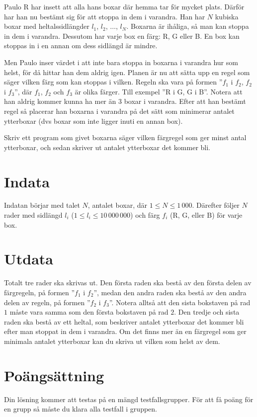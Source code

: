Paulo R har insett att alla hans boxar där hemma tar för mycket plats. Därför har han nu
bestämt sig för att stoppa in dem i varandra. Han har $N$ kubiska boxar med
heltalssidlängder $l_1$, $l_2$, $\ldots$, $l_N$. Boxarna är ihåliga, så man kan stoppa in
dem i varandra. Dessutom har varje box en färg: R, G eller B. 
En box kan stoppas in i en annan om dess sidlängd är mindre.

Men Paulo inser värdet i att inte bara stoppa in boxarna i varandra hur som helst,
för då hittar han dem aldrig igen.
Planen är nu att sätta upp en regel som säger vilken färg som kan stoppas i
vilken. Regeln ska vara på formen ''$f_1$ i $f_2$, $f_2$ i $f_3$'', 
där $f_1$, $f_2$ och $f_3$ är olika färger. Till exempel ''R i
G, G i B''. Notera att han aldrig kommer kunna ha mer än 3 boxar i
varandra. Efter att han bestämt regel så placerar han boxarna i varandra på det sätt
som minimerar antalet ytterboxar (dvs boxar som inte ligger inuti en annan box).

Skriv ett program som givet boxarna säger vilken färgregel som ger minst antal
ytterboxar, och sedan skriver ut antalet ytterboxar det kommer bli.

\section*{Indata}

Indatan börjar med talet $N$, antalet boxar, där $1\le N \le 1\,000$. Därefter följer $N$ rader med sidlängd
$l_i$ ($1 \le l_i \le 10\,000\,000$) och färg $f_i$ (R, G, eller B) för varje box.

\section*{Utdata}

Totalt tre rader ska skrivas ut. Den första raden ska bestå av den första delen
av färgregeln, på formen ''$f_1$ i $f_2$'', medan den andra raden ska bestå av 
den andra delen av regeln, på formen ''$f_2$ i $f_3$''. Notera alltså att den sista bokstaven på
rad $1$ måste vara samma som den första bokstaven på rad $2$.
Den tredje och sista raden ska bestå av ett heltal, som beskriver antalet ytterboxar det kommer bli
efter man stoppat in dem i varandra. Om det finns mer än en färgregel 
som ger minimala antalet ytterboxar kan du skriva ut vilken som helst av dem.

\section*{Poängsättning}
Din lösning kommer att testas på en mängd testfallsgrupper. För att få poäng för en grupp
så måste du klara alla testfall i gruppen.

